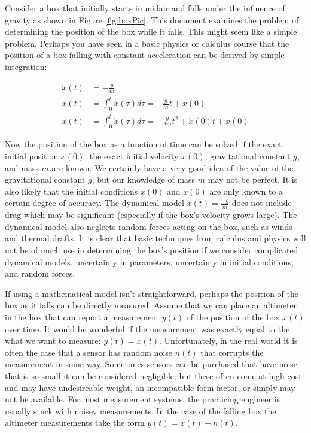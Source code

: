 \documentclass{article}
\begin{document}
Consider a box that initially starts in midair and falls under the influence of gravity as shown in Figure \ref{fig:boxPic}.  This document examines the problem of determining the position of the box while it falls.  This might seem like a simple problem.  Perhaps you have seen in a basic physics or calculus course that the position of a box falling with constant acceleration can be derived by simple integration:

\begin{align*}
\ddot{x}(t) &= -\frac{g}{m}\\
\dot{x}(t) 	& =\int_0^t\!\ddot{x}(\tau)d\tau 	= -\frac{g}{m}t+\dot{x}(0)\\
x(t) 		&= \int_0^t\!\dot{x}(\tau)d\tau 	= -\frac{g}{2m}t^2+\dot{x}(0)t+x(0)
\end{align*}

Now the position of the box as a function of time can be solved if the exact initial position $x(0)$, the exact initial velocity $\dot{x}(0)$, gravitational constant $g$, and mass $m$ are known.  We certainly have a very good idea of the value of the gravitational constant $g$, but our knowledge of mass $m$ may not be perfect.  It is also likely that the initial conditions $x(0)$ and $\dot{x}(0)$ are only known to a certain degree of accuracy.  The dynamical model $\ddot{x}(t)=\frac{-g}{m}$ does not include drag which may be significant (especially if the box's velocity grows large).  The dynamical model also neglects random forces acting on the box, such as winds and thermal drafts.  It is clear that basic techniques from calculus and physics will not be of much use in determining the box's position if we consider complicated dynamical models, uncertainty in parameters, uncertainty in initial conditions, and random forces.  

If using a mathematical model isn't straightforward, perhaps the position of the box as it falls can be directly measured.  Assume that we can place an altimeter in the box that can report a measurement $y(t)$ of the position of the box $x(t)$ over time.  It would be wonderful if the measurement was exactly equal to the what we want to measure: $y(t)=x(t)$.  Unfortunately, in the real world it is often the case that a sensor has random noise $n(t)$ that corrupts the measurement in some way.  Sometimes sensors can be purchased that have noise that is so small it can be considered negligible; but these often come at high cost and may have undesireable weight, an incompatible form factor, or simply may not be available.  For most measurement systems, the practicing engineer is usually stuck with noisey measurements.  In the case of the falling box the altimeter measurements take the form $y(t)=x(t)+n(t)$. 
\end{document}
